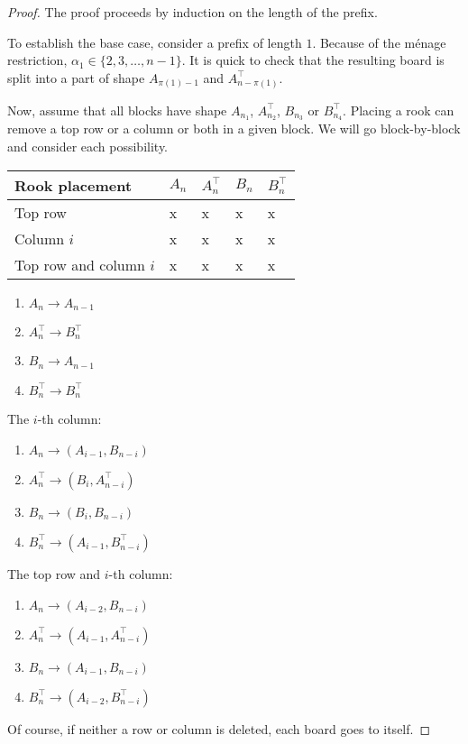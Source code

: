 \begin{proof}
  The proof proceeds by induction on the length of the prefix.

  To establish the base case, consider a prefix of length $1$.
  Because of the m\'enage restriction,
  $\alpha_1 \in \{2, 3, \dots, n-1\}$.
  It is quick to check that the resulting board is split into a part of shape
  $A_{\pi(1) - 1}$ and $A^\top_{n - \pi(1)}$.

  Now, assume that all blocks have shape $A_{n_1}$, $A^\top_{n_2}$,
  $B_{n_3}$ or $B^\top_{n_4}$. Placing a rook can remove a top row or a column
  or both in a given block. We will go block-by-block and consider each
  possibility.

  \begin{table}
    \begin{tabular}{|l|l|l|l|l|}
    \hline
    Rook placement & $A_n$ & $A^\top_n$ & $B_n$ & $B^\top_n$ \\
    \hline
    Top row                & x    & x              & x & x \\
    Column $i$             & x    & x              & x & x \\
    Top row and column $i$ & x    & x              & x & x \\
    \hline
    \end{tabular}
  \end{table}
  \begin{enumerate}
    \item $A_n      \rightarrow A_{n-1}$
    \item $A^\top_n \rightarrow B^\top_{n}$
    \item $B_n      \rightarrow A_{n-1}$
    \item $B^\top_n \rightarrow B^\top_{n}$
  \end{enumerate}

  The $i$-th column: \begin{enumerate}
    \item $A_n      \rightarrow (A_{i-1}, B_{n-i})$
    \item $A^\top_n \rightarrow (B_i,     A^\top_{n-i})$
    \item $B_n      \rightarrow (B_i,     B_{n-i})$
    \item $B^\top_n \rightarrow (A_{i-1}, B^\top_{n-i})$
  \end{enumerate}

  The top row and $i$-th column: \begin{enumerate}
    \item $A_n      \rightarrow (A_{i-2}, B_{n-i})$
    \item $A^\top_n \rightarrow (A_{i-1}, A^\top_{n-i})$
    \item $B_n      \rightarrow (A_{i-1}, B_{n-i})$
    \item $B^\top_n \rightarrow (A_{i-2}, B^\top_{n-i})$
  \end{enumerate}

  Of course, if neither a row or column is deleted, each board goes to itself.
\end{proof}

